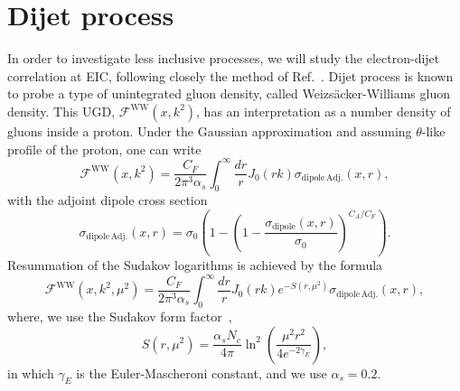 \documentclass[a4,12pt]{article}
\newcommand{\fww}[0]{\mathcal{F}^{\mathrm{WW}}}
\newcommand{\sdp}[0]{\sigma_{\mathrm{dipole}}}
\newcommand{\sdpa}[0]{\sigma_{\mathrm{dipole\,Adj.}}}
\begin{document}
\section{Dijet process}
In order to investigate less inclusive processes, we will study the electron-dijet correlation at EIC, following closely the method of Ref.~\cite{vanHameren:2021sqc}. 
Dijet process is known to probe a type of unintegrated gluon density, called Weizs\"acker-Williams gluon density\cite{}.
This UGD, $\fww(x,k^2)$, has an interpretation as a number density of gluons inside a proton. Under the Gaussian approximation and assuming $\theta$-like profile of the proton, one can write  
\begin{equation}
\fww(x,k^2)= \frac{C_F}{2\pi^3\alpha_s}\int^\infty_0\frac{dr}{r}J_0(r k) \sdpa(x,r),
\end{equation} 	
with the adjoint dipole cross section
\begin{equation}
\sdpa(x,r)=\sigma_0\left( 1-\left(1-\frac{\sdp(x,r)}{\sigma_0}\right)^{C_A/C_F}\right).
\end{equation}
Resummation of the Sudakov logarithms is achieved by the formula~\cite{}
\begin{equation}
	\fww(x,k^2,\mu^2)= \frac{C_F}{2\pi^3\alpha_s}\int^\infty_0\frac{dr}{r}J_0(r k) e^{-S(r,\mu^2)} \sdpa(x,r),
\end{equation}
where, we use the Sudakov form factor~\cite{},
\begin{equation}
	S(r,\mu^2)=\frac{\alpha_s N_c}{4\pi}\ln^2\left(\frac{\mu^2r^2}{4e^{-2\gamma_E}}\right),
\end{equation}
in which $\gamma_E$ is the Euler-Mascheroni constant, and we use $\alpha_s=0.2$. 
\end{document}
